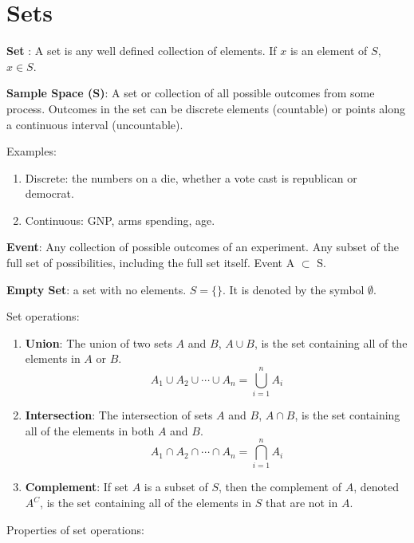 \documentclass[]{book}
\providecommand{\tightlist}{%
  \setlength{\itemsep}{0pt}\setlength{\parskip}{0pt}}
\theoremstyle{definition}
\theoremstyle{definition}
\theoremstyle{definition}
\theoremstyle{remark}
\begin{document}
\hypertarget{setoper}{%
\section{Sets}\label{setoper}}

\textbf{Set} : A set is any well defined collection of elements. If \(x\) is an element of \(S\), \(x \in S\).

\textbf{Sample Space (S)}: A set or collection of all possible outcomes from some process. Outcomes in the set can be discrete elements (countable) or points along a continuous interval (uncountable).

Examples:

\begin{enumerate}
\def\labelenumi{\arabic{enumi}.}
\tightlist
\item
  Discrete: the numbers on a die, whether a vote cast is republican or democrat.
\item
  Continuous: GNP, arms spending, age.
\end{enumerate}

\textbf{Event}: Any collection of possible outcomes of an experiment. Any subset of the full set of possibilities, including the full set itself. Event A \(\subset\) S.

\textbf{Empty Set}: a set with no elements. \(S = \{\}\). It is denoted by the symbol \(\emptyset\).

Set operations:

\begin{enumerate}
\def\labelenumi{\arabic{enumi}.}
\tightlist
\item
  \textbf{Union}: The union of two sets \(A\) and \(B\), \(A \cup B\), is the set containing all of the elements in \(A\) or \(B\). \[A_1 \cup A_2  \cup \cdots \cup A_n = \bigcup_{i=1}^n A_i\]
\item
  \textbf{Intersection}: The intersection of sets \(A\) and \(B\), \(A \cap B\), is the set containing all of the elements in both \(A\) and \(B\). \[A_1 \cap A_2  \cap \cdots \cap A_n = \bigcap_{i=1}^n A_i\]
\item
  \textbf{Complement}: If set \(A\) is a subset of \(S\), then the complement of \(A\), denoted \(A^C\), is the set containing all of the elements in \(S\) that are not in \(A\).
\end{enumerate}

Properties of set operations:
\end{document}

